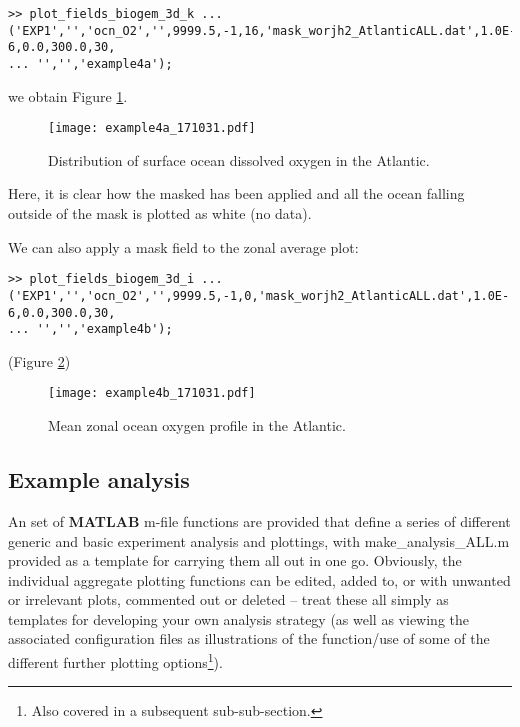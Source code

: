 \documentclass[11pt,fleqn]{book} %
\begin{document}
\begin{enumerate}[noitemsep]
\footnotesize
\vspace{-0pt}\begin{verbatim}
>> plot_fields_biogem_3d_k ...
('EXP1','','ocn_O2','',9999.5,-1,16,'mask_worjh2_AtlanticALL.dat',1.0E-6,0.0,300.0,30, 
... '','','example4a');
\end{verbatim}\vspace{-0pt}
\normalsize
we obtain Figure \ref{fig:example4a}.
 
\begin{figure}[ht]
\begin{center}
\texttt{[image: example4a\_171031.pdf]}
\end{center}
\vspace{-4mm}
\caption{Distribution of surface ocean dissolved  oxygen in the Atlantic.}
\label{fig:example4a}
\end{figure}

Here, it is clear how the masked has been applied and all the ocean falling outside of the mask is plotted as white (no data).

We can also apply a mask field to the zonal average plot:

\footnotesize
\vspace{-0pt}\begin{verbatim}
>> plot_fields_biogem_3d_i ...
('EXP1','','ocn_O2','',9999.5,-1,0,'mask_worjh2_AtlanticALL.dat',1.0E-6,0.0,300.0,30, 
... '','','example4b');
\end{verbatim}\vspace{-0pt}
\normalsize
(Figure \ref{fig:example4b})

\begin{figure}[ht]
\begin{center}
\texttt{[image: example4b\_171031.pdf]}
\end{center}
\vspace{-4mm}
\caption{Mean zonal ocean oxygen profile in the Atlantic.}
\label{fig:example4b}
\end{figure}

\end{enumerate}


\subsection{Example analysis}

An set of \textbf{MATLAB} \footnotesize\textsf{m-file }\normalsize functions are provided that define a series of different generic and basic experiment analysis and plottings, with \footnotesize\textsf{make\_analysis\_ALL.m }\normalsize provided as a template for carrying them all out in one go. Obviously, the individual aggregate plotting functions can be edited, added to, or with unwanted or irrelevant plots, commented out or deleted -- treat these all simply as templates for developing your own analysis strategy (as well as viewing the associated configuration files as illustrations of the function/use of some of the different further plotting options\footnote{Also covered in a subsequent sub-sub-section.}).
\end{document}
